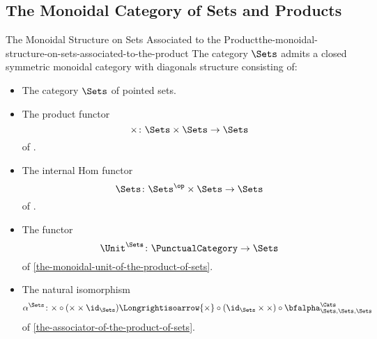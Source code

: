 \subsection{The Monoidal Category of Sets and Products}\label{subsection-the-monoidal-category-of-sets-and-products}
\begin{proposition}{The Monoidal Structure on Sets Associated to the Product}{the-monoidal-structure-on-sets-associated-to-the-product}%
    The category $\Sets$ admits a closed symmetric monoidal category with diagonals structure consisting of:%
    \begin{itemize}
        \item{}The category $\Sets$ of pointed sets.
        \item{}The product functor
            \[
                \times%
                \colon%
                \Sets\times\Sets%
                \to%
                \Sets
            \]%
            of .
        \item{}The internal Hom functor
            \[
                \Sets%
                \colon%
                \Sets^{\op}\times\Sets%
                \to%
                \Sets%
            \]%
            of .
        \item{}The functor
            \[
                \Unit^{\Sets}
                \colon
                \PunctualCategory
                \to
                \Sets
            \]
            of \cref{the-monoidal-unit-of-the-product-of-sets}.
        \item{}The natural isomorphism
            \[
                \alpha^{\Sets}
                \colon
                {\times}\circ{({\times}\times\id_{\Sets})}
                \Longrightisoarrow
                {\times}\circ{(\id_{\Sets}\times{\times})}\circ{\bfalpha^{\Cats}_{\Sets,\Sets,\Sets}}
            \]
            of \cref{the-associator-of-the-product-of-sets}.

\end{itemize}
\end{proposition}
